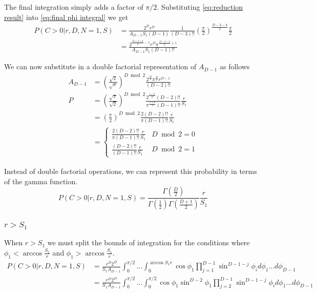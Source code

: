 \documentclass{article}
\begin{document}
The final integration simply adds a factor of $\pi/2$. Substituting \ref{eq:reduction result} into \ref{eq:final phi integral} we get
\begin{align}
	P(C>0|r, D, N=1, S) &= \frac{2^Dr^D}{A_{D-1}S_1(D-1)}\frac{1}{(D-3)!!}\left(\frac{\pi}{2}\right)^{\frac{D-3-k}{2}}\frac{\pi}{2}\\
	&= \frac{2^{\frac{D+3+k}{2}-1}r^D\pi^{\frac{D-3-k}{2}+1}}{A_{D-1}S_1(D-1)!!}
\end{align}

We can now substitute in a double factorial representation of $A_{D-1}$ as follows
\begin{align}
	A_{D-1} &= \left(\frac{\sqrt{2}}{\sqrt{\pi}}\right)^{D\bmod2}\frac{2^{\frac{D}{2}}\pi^{\frac{D}{2}}r^{D-1}}{(D-2)!!}\\
	P &= \left(\frac{\sqrt{\pi}}{\sqrt{2}}\right)^{D\bmod 2}\frac{2^{\frac{1+k}{2}}(D-2)!!}{\pi^{\frac{1+k}{2}}(D-1)!!}\frac{r}{S_1}\\
	&= \left(\frac{\pi}{2}\right)^{D\bmod 2}\frac{2(D-2)!!}{\pi(D-1)!!}\frac{r}{S_1}\\
	&= \begin{cases}
		\frac{2(D-2)!!}{\pi(D-1)!!}\frac{r}{S_1} & D\bmod 2 = 0 \\
		\frac{(D-2)!!}{(D-1)!!}\frac{r}{S_1} & D\bmod 2 = 1
	\end{cases}
\end{align}

Instead of double factorial operations, we can represent this probability in terms of the gamma function.
\begin{equation}
	P(C>0|r, D, N=1, S) = \frac{\Gamma(\frac{D}{2})}{\Gamma(\frac{1}{2})\Gamma(\frac{D+1}{2})}\frac{r}{S_1}
\end{equation}

\subsubsection{$r>S_1$}
When $r>S_1$ we must split the bounds of integration for the conditions where $\phi_1<\arccos{\frac{S_1}{r}}$ and $\phi_1>\arccos{\frac{S_1}{r}}$. 
\begin{align}
	P(C>0|r, D, N=1, S) &= \frac{r^D 2^D}{S_1 A_{D-1}}\int_0^{\pi/2} \hdots \int_0^{\arccos{S_1}{r}} \cos\phi_1 \prod_{j=1}^{D-1}\sin^{D-1-j} \phi_i d\phi_1\hdots d\phi_{D-1}\\
	&= \frac{r^D 2^D}{S_1 A_{D-1}}\int_0^{\pi/2} \hdots \int_0^{\pi/2} \cos\phi_1\sin^{D-2}\phi_1 \prod_{j=2}^{D-1}\sin^{D-1-j}\phi_i d\phi_1\hdots d\phi_{D-1}
\end{align}
\end{document}
